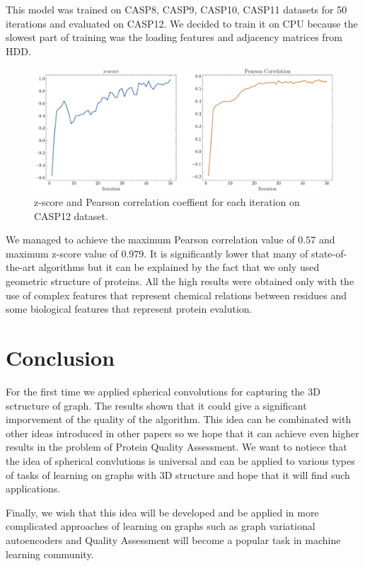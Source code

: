 \documentclass[12pt,twoside]{article}
\begin{document}
	This model was trained on CASP8, CASP9, CASP10, CASP11 datasets for 50 iterations and evaluated on CASP12. We decided to train
	it on CPU because the slowest part of training was the loading features and adjacency matrices from HDD.
	\begin{figure}[h]
		\centering
		\includegraphics[width=1.0\textwidth]{img/z_score_casp12.pdf}
		\caption{z-score and Pearson correlation coeffient for each iteration on CASP12 dataset.}
		\label{fig:mesh1}
	\end{figure}

	We managed to achieve the maximum Pearson correlation value of $0.57$ and maximum z-score value of $0.979$. It is significantly lower
	that many of state-of-the-art algorithms\cite{Baldassarre2020GRAPHQAPM} but it can be explained by the fact that we only used geometric structure of proteins.
	All the high results were obtained only with the use of complex features that represent chemical relations between residues and some
	biological features that represent protein evalution\cite{Baldassarre2020GRAPHQAPM}.

	\section{Conclusion}
	For the first time we applied spherical convolutions for capturing the 3D sctructure of graph. The results shown that it could
	give a significant imporvement of the quality of the algorithm. This idea can be combinated with other ideas introduced in other papers
	\cite{Pages2019}\cite{Baldassarre2020GRAPHQAPM}\cite{Uziela2016} so we hope that it can achieve even higher results in the problem
	of Protein Quality Assessment. We want to notiece that the idea of spherical convlutions is universal and can be applied to
	various types of tasks of learning on graphs with 3D structure and hope that it will find such applications.

	Finally, we wish that this idea will be developed and be applied in more complicated approaches of learning on graphs such as
	graph variational autoencoders\cite{Kipf2016a} and Quality Assessment will become a popular task in machine learning community.
	
\end{document}
